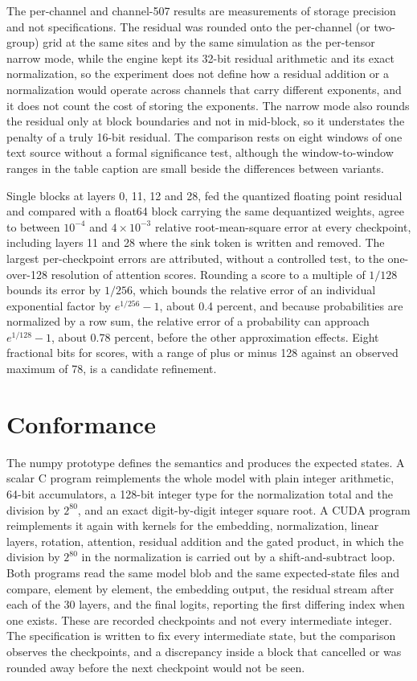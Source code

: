 \documentclass[11pt]{article}
\begin{document}
The per-channel and channel-507 results are measurements of storage precision and not specifications. The residual was rounded onto the per-channel (or two-group) grid at the same sites and by the same simulation as the per-tensor narrow mode, while the engine kept its 32-bit residual arithmetic and its exact normalization, so the experiment does not define how a residual addition or a normalization would operate across channels that carry different exponents, and it does not count the cost of storing the exponents. The narrow mode also rounds the residual only at block boundaries and not in mid-block, so it understates the penalty of a truly 16-bit residual. The comparison rests on eight windows of one text source without a formal significance test, although the window-to-window ranges in the table caption are small beside the differences between variants.

Single blocks at layers 0, 11, 12 and 28, fed the quantized floating point residual and compared with a float64 block carrying the same dequantized weights, agree to between $10^{-4}$ and $4\times10^{-3}$ relative root-mean-square error at every checkpoint, including layers 11 and 28 where the sink token is written and removed. The largest per-checkpoint errors are attributed, without a controlled test, to the one-over-128 resolution of attention scores. Rounding a score to a multiple of $1/128$ bounds its error by $1/256$, which bounds the relative error of an individual exponential factor by $e^{1/256}-1$, about 0.4 percent, and because probabilities are normalized by a row sum, the relative error of a probability can approach $e^{1/128}-1$, about 0.78 percent, before the other approximation effects. Eight fractional bits for scores, with a range of plus or minus 128 against an observed maximum of 78, is a candidate refinement.

\section{Conformance}

The numpy prototype defines the semantics and produces the expected states. A scalar C program reimplements the whole model with plain integer arithmetic, 64-bit accumulators, a 128-bit integer type for the normalization total and the division by $2^{80}$, and an exact digit-by-digit integer square root. A CUDA program reimplements it again with kernels for the embedding, normalization, linear layers, rotation, attention, residual addition and the gated product, in which the division by $2^{80}$ in the normalization is carried out by a shift-and-subtract loop. Both programs read the same model blob and the same expected-state files and compare, element by element, the embedding output, the residual stream after each of the 30 layers, and the final logits, reporting the first differing index when one exists. These are recorded checkpoints and not every intermediate integer. The specification is written to fix every intermediate state, but the comparison observes the checkpoints, and a discrepancy inside a block that cancelled or was rounded away before the next checkpoint would not be seen.
\end{document}
